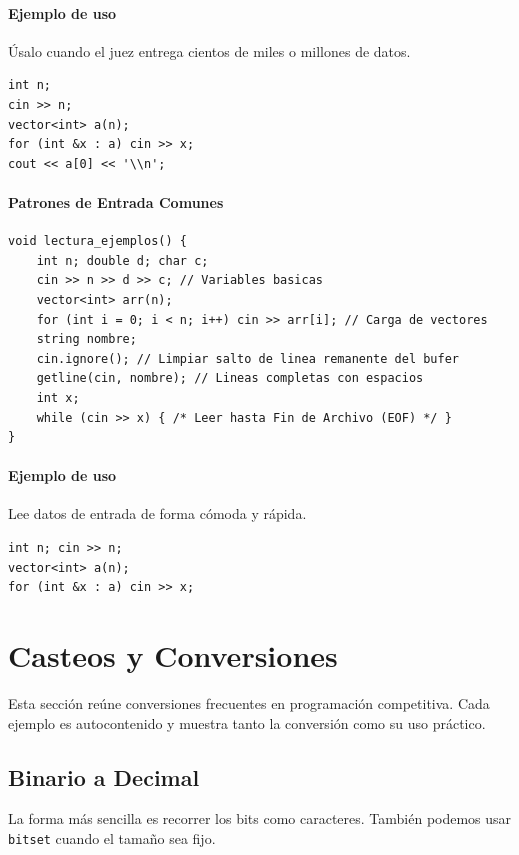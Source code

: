 \documentclass[10pt,twocolumn,letterpaper]{report}
\begin{document}
\subsubsection*{Ejemplo de uso}
Úsalo cuando el juez entrega cientos de miles o millones de datos.
\begin{lstlisting}
int n;
cin >> n;
vector<int> a(n);
for (int &x : a) cin >> x;
cout << a[0] << '\\n';
\end{lstlisting}

\subsubsection{Patrones de Entrada Comunes}
\begin{lstlisting}
void lectura_ejemplos() {
    int n; double d; char c;
    cin >> n >> d >> c; // Variables basicas
    vector<int> arr(n);
    for (int i = 0; i < n; i++) cin >> arr[i]; // Carga de vectores
    string nombre;
    cin.ignore(); // Limpiar salto de linea remanente del bufer
    getline(cin, nombre); // Lineas completas con espacios
    int x;
    while (cin >> x) { /* Leer hasta Fin de Archivo (EOF) */ }
}
\end{lstlisting}
\subsubsection*{Ejemplo de uso}
Lee datos de entrada de forma cómoda y rápida.
\begin{lstlisting}
int n; cin >> n;
vector<int> a(n);
for (int &x : a) cin >> x;
\end{lstlisting}


\chapter{Casteos y Conversiones}
Esta sección reúne conversiones frecuentes en programación competitiva.
Cada ejemplo es autocontenido y muestra tanto la conversión como su uso
práctico.

\section{Binario a Decimal}
La forma más sencilla es recorrer los bits como caracteres. También podemos
usar \texttt{bitset} cuando el tamaño sea fijo.
\end{document}
